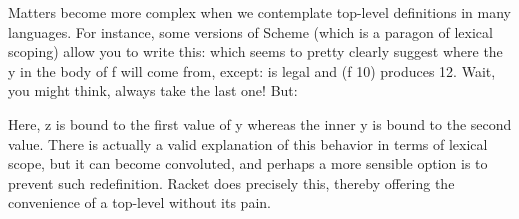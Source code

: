 

Matters become more complex when we contemplate top-level definitions in many
languages. For instance, some versions of Scheme (which is a paragon of lexical
scoping) allow you to write this:
which seems to pretty clearly suggest where the y in the body of f will come
from, except:
is legal and (f 10) produces 12. Wait, you might think, always take the last
one! But:

Here, z is bound to the first value of y whereas the inner y is bound to the
second value. There is actually a valid explanation of this behavior in terms of
lexical scope, but it can become convoluted, and perhaps a more sensible option
is to prevent such redefinition. Racket does precisely this, thereby offering
the convenience of a top-level without its pain.

\secup
